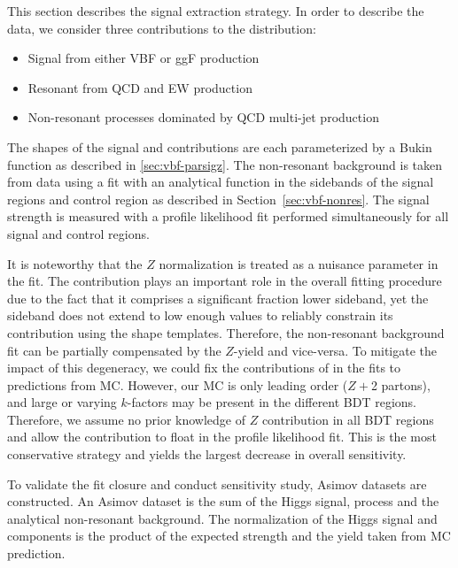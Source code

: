 This section describes the signal extraction strategy. In order to describe the data, we consider three contributions to the \Mbb{} distribution:  
\begin{itemize}
  \item Signal \Hbb from either VBF or ggF production
  \item Resonant \zjets{} from QCD and EW production
  \item Non-resonant processes dominated by QCD multi-jet production
\end{itemize}

The shapes of the signal and \zjets{} contributions are each parameterized by a Bukin function as described in \ref{sec:vbf-parsigz}. The non-resonant background is taken from data using a fit with an analytical function in the \Mbb{} sidebands of the signal regions and control region as described in Section~\ref{sec:vbf-nonres}.
The signal strength is measured with a profile likelihood fit performed simultaneously for all signal and control regions.

It is noteworthy that the $Z$ normalization is treated as a nuisance parameter in the fit. The \zjets{} contribution plays an important role in the overall fitting procedure due to the fact that it comprises a significant fraction lower \Mbb{} sideband, yet the sideband does not extend to low enough \Mbb{} values to reliably constrain its contribution using the shape templates.  Therefore, the non-resonant background fit can be partially compensated by the $Z$-yield and vice-versa.  To mitigate the impact of this degeneracy, we could fix the contributions of \zjets{} in the fits to predictions from MC.  However, our \zjets{} MC is only leading order ($Z+$2 partons), and large or varying $k$-factors may be present in the different BDT regions.  Therefore, we assume no prior knowledge of $Z$ contribution in all BDT regions and allow the contribution to float in the profile likelihood fit. This is the most conservative strategy and yields the largest decrease in overall sensitivity.

To validate the fit closure and conduct sensitivity study, Asimov datasets are constructed. An Asimov dataset is the sum of the Higgs signal, \zjets{} process and the analytical non-resonant background. The normalization of the Higgs signal and \zjets{} components is the product of the expected strength and the yield taken from MC prediction.


